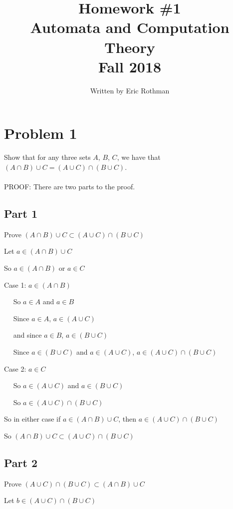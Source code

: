 \documentclass[letterpaper, 11pt]{article}
\begin{document}
\title{Homework \#1 \\ Automata and Computation Theory \\Fall 2018}
\author{Written by Eric Rothman}

\maketitle

\section{Problem 1}
Show that for any three sets $A$, $B$, $C$, we have that\\

$(A \cap B) \cup C = (A \cup C) \cap (B \cup C)$.\\\\
PROOF: There are two parts to the proof.
\subsection*{Part 1}
Prove $(A \cap B) \cup C \subset (A \cup C) \cap (B \cup C)$

Let $a \in (A \cap B) \cup C$

So $a \in (A \cap B)$ or $a \in C$

Case 1: $a \in (A \cap B)$

$\quad$ So $a \in A$ and $a \in B$

$\quad$ Since $a \in A$, $a \in (A \cup C)$

$\quad$ and since $a \in B$, $a \in (B \cup C)$

$\quad$ Since $a \in (B \cup C)$ and $a \in (A \cup C)$, $a \in (A \cup C) \cap (B \cup C)$

Case 2: $a \in C$

$\quad$ So $a \in (A \cup C)$ and $a \in (B \cup C)$

$\quad$ So $a \in (A \cup C) \cap (B \cup C)$

So in either case if $a \in (A \cap B) \cup C$, then $a \in (A \cup C) \cap (B \cup C)$

So $(A \cap B) \cup C \subset (A \cup C) \cap (B \cup C)$

\subsection*{Part 2}
Prove $(A \cup C) \cap (B \cup C) \subset (A \cap B) \cup C$

Let $b \in (A \cup C) \cap (B \cup C)$
\end{document}
